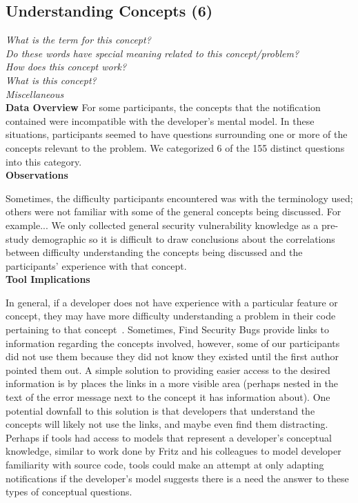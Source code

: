 \documentclass[conference]{IEEEtran}
\begin{document}

\noindent\subsection{\textbf{Understanding Concepts (6)}}\label{uc}

\noindent\emph{What is the term for this concept?} \\
\emph{Do these words have special meaning related to this concept/problem?} \\
\emph{How does this concept work?} \\
\emph{What is this concept?} \\
\emph{Miscellaneous} \\


\noindent\textbf{Data Overview}
For some participants, the concepts that the notification contained were incompatible with the developer's mental model. 
In these situations, participants seemed to have questions surrounding one or more of the concepts relevant to the problem.
We categorized 6 of the 155 distinct questions into this category. 
\\

\noindent\textbf{Observations}


Sometimes, the difficulty participants encountered was with the terminology used; others were not familiar with some of the general concepts being discussed. For example...
We only collected general security vulnerability knowledge as a pre-study demographic so it is difficult to draw conclusions about the correlations between difficulty understanding the concepts being discussed and the participants' experience with that concept.
\\

\noindent\textbf{Tool Implications}

In general, if a developer does not have experience with a particular feature or concept, they may have more difficulty understanding a problem in their code pertaining to that concept~\cite{wiedenbeck1993mental}.
Sometimes, Find Security Bugs provide links to information regarding the concepts involved, however, some of our participants did not use them because they did not know they existed until the first author pointed them out. 
A simple solution to providing easier access to the desired information is by places the links in a  more visible area (perhaps nested in the text of the error message next to the concept it has information about). 
One potential downfall to this solution is that developers that understand the concepts will likely not use the links, and maybe even find them distracting.   
Perhaps if tools had access to models that represent a developer's conceptual knowledge, similar to work done by Fritz and his colleagues to model developer familiarity with source code, tools could make an attempt at only adapting notifications if the developer's model suggests there is a need the answer to these types of conceptual questions.
\end{document}
